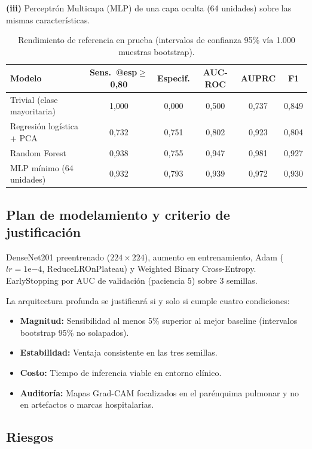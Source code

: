 \documentclass[11pt]{article}
\begin{document}
\textbf{(iii)} Perceptrón Multicapa (MLP) de una capa oculta (64 unidades) sobre las mismas características.

\begin{table}[h]
\centering
\small
\caption{Rendimiento de referencia en prueba (intervalos de confianza 95\% vía 1.000 muestras bootstrap).}
\label{tab:baseline}
\begin{tabular}{@{}lccccc@{}}
\toprule
\textbf{Modelo} & \textbf{Sens.\ @esp\(\ge\)0,80} & \textbf{Especif.} & \textbf{AUC-ROC} & \textbf{AUPRC} & \textbf{F1} \\
\midrule
Trivial (clase mayoritaria) & 1,000 & 0,000 & 0,500 & 0,737 & 0,849 \\
Regresión logística + PCA & 0,732 & 0,751 & 0,802 & 0,923 & 0,804 \\
Random Forest & 0,938 & 0,755 & 0,947 & 0,981 & 0,927 \\
MLP mínimo (64 unidades) & 0,932 & 0,793 & 0,939 & 0,972 & 0,930 \\
\bottomrule
\end{tabular}
\end{table}

\subsection{Plan de modelamiento y criterio de justificación}

DenseNet201 preentrenado ($224 \times 224$), aumento en entrenamiento, Adam ($lr = 1\mathrm{e}{-4}$, ReduceLROnPlateau) y Weighted Binary Cross-Entropy. EarlyStopping por AUC de validación (paciencia 5) sobre 3 semillas.

La arquitectura profunda se justificará si y solo si cumple cuatro condiciones:
\begin{itemize}
  \item \textbf{Magnitud:} Sensibilidad al menos 5\% superior al mejor baseline (intervalos bootstrap 95\% no solapados).
  \item \textbf{Estabilidad:} Ventaja consistente en las tres semillas.
  \item \textbf{Costo:} Tiempo de inferencia viable en entorno clínico.
  \item \textbf{Auditoría:} Mapas Grad-CAM \parencite{selvaraju2017} focalizados en el parénquima pulmonar y no en artefactos o marcas hospitalarias.
\end{itemize}

\subsection{Riesgos}
\end{document}
